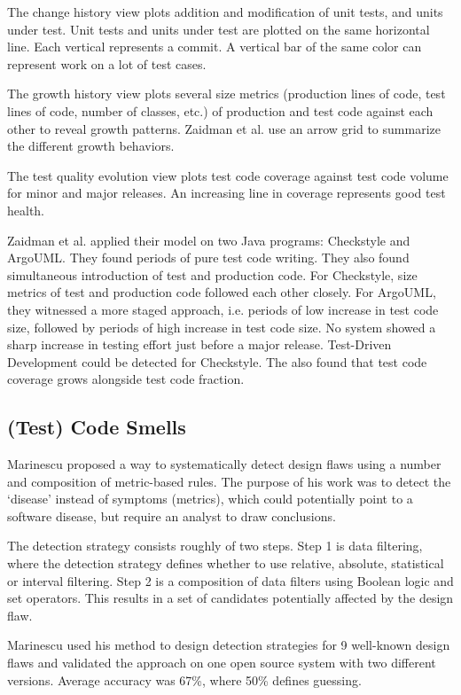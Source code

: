 \documentclass{uvamscse}
\newcommand{\ACoEvolution}{Zaidman et al.}
\begin{document}
The change history view plots addition and modification of unit tests, and units under test. Unit tests and units under test are plotted on the same horizontal line. Each vertical represents a commit. A vertical bar of the same color can represent work on a lot of test cases. 

The growth history view plots several size metrics (production lines of code, test lines of code, number of classes, etc.) of production and test code against each other to reveal growth patterns. \ACoEvolution{} use an arrow grid to summarize the different growth behaviors. 

The test quality evolution view plots test code coverage against test code volume for minor and major releases. An increasing line in coverage represents good test health. 

\ACoEvolution{} applied their model on two Java programs: Checkstyle and ArgoUML. They found periods of pure test code writing. They also found simultaneous introduction of test and production code. For Checkstyle, size metrics of test and production code followed each other closely. For ArgoUML, they witnessed a more staged approach, i.e. periods of low increase in test code size, followed by periods of high increase in test code size. No system showed a sharp increase in testing effort just before a major release. Test-Driven Development could be detected for Checkstyle. The also found that test code coverage grows alongside test code fraction. 

\subsection{(Test) Code Smells}
Marinescu \cite{marinescu2004detection} proposed a way to systematically detect design flaws using a number and composition of metric-based rules. The purpose of his work was to detect the ‘disease’ instead of symptoms (metrics), which could potentially point to a software disease, but require an analyst to draw conclusions. 

The detection strategy consists roughly of two steps. Step 1 is data filtering, where the detection strategy defines whether to use relative, absolute, statistical or interval filtering. Step 2 is a composition of data filters using Boolean logic and set operators. This results in a set of candidates potentially affected by the design flaw. 

Marinescu used his method to design detection strategies for 9 well-known design flaws and validated the approach on one open source system with two different versions.  Average accuracy was 67\%, where 50\% defines guessing.\\
\end{document}
